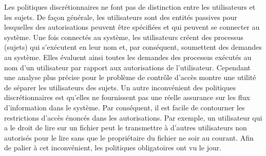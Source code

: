 \label{sectionVulnérabilitéDAC}

Les politiques discrétionnaires ne font pas de distinction entre les utilisateurs et les sujets. De façon  générale, les utilisateurs sont des entités passives pour lesquelles des autorisations peuvent être spécifiées et qui peuvent se connecter au système. Une fois connectés au système, les utilisateurs créent des processus (sujets) qui s'exécutent en leur nom et, par conséquent, soumettent des demandes au système. Elles évaluent ainsi toutes les demandes des processus exécutés au nom d'un utilisateur par rapport aux autorisations de l'utilisateur. Cependant une analyse plus précise pour le problème de contrôle d'accès montre une utilité de séparer les utilisateurs des sujets. Un autre inconvénient des politiques discrétionnaires est qu'elles ne fournissent pas une réelle assurance sur les flux d'information dans le système. Par conséquent, il est facile de contourner les restrictions d'accès énoncés dans les autorisations. Par exemple, un utilisateur qui a le droit de lire sur un fichier peut le transmettre à d'autres utilisateurs non autorisés pour le lire sans que le propriétaire du fichier ne soir au courant. Afin de palier à cet inconvénient, les politiques obligatoires ont vu le jour.


\label{sectionMAC}

